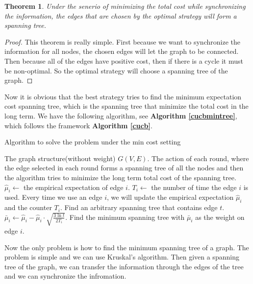 \documentclass{article}
\theoremstyle{plain}
\newtheorem{thm}{Theorem}[section]
\theoremstyle{definition}
\theoremstyle{remark}
\begin{document}
    \begin{thm}\label{min-spanning-tree}
        Under the senerio of minimizing the total cost while synchronizing the information, the edges that are chosen by the optimal strategy will form a spanning tree.
    \end{thm}
    \begin{proof}
        This theorem is really simple. First because we want to synchronize the information for all nodes, the chosen edges will let the graph to be connected. Then because all of the edges have positive cost, then if there is a cycle it must be non-optimal. So the optimal strategy will choose a spanning tree of the graph.
    \end{proof}

    Now it is obvious that the best strategy tries to find the minimum expectation cost spanning tree, which is the spanning tree that minimize the total cost in the long term. We have the following algorithm, see \textbf{Algorithm \ref{cucbmintree}}, which follows the framework \textbf{Algorithm \ref{cucb}}.

    \begin{algorithm}
        \caption{Algorithm to solve the problem under the min cost setting}
        \label{cucbmintree}
        \begin{algorithmic}[1]
        \Require The graph structure(without weight) $G(V,E)$.
        \Ensure The action of each round, where the edge selected in each round forms a spanning tree of all the nodes and then the algorithm tries to minimize the long term total cost of the spanning tree.
            \State $\hat \mu_i \leftarrow$ the empirical expectation of edge $i$.
            \State $T_i \leftarrow$ the number of time the edge $i$ is used.
            \State Every time we use an edge $i$, we will update the empirical expectation $\hat \mu_i$ and the counter $T_i$.
                \State Find an arbitrary spanning tree that contains edge $t$.
            \EndFor
                \State $\bar\mu_i \leftarrow \hat\mu_i - \hat\mu_i\cdot\sqrt{\frac{3\ln t}{2T_i}}$.
                \State Find the minimum spanning tree with $\bar\mu_i$ as the weight on edge $i$.
            \EndFor
        \EndProcedure
        \end{algorithmic}
    \end{algorithm}

    Now the only problem is how to find the minimum spanning tree of a graph. The problem is simple and we can use Kruskal's algorithm. Then given a spanning tree of the graph, we can transfer the information through the edges of the tree and we can synchronize the infromation.
\end{document}
